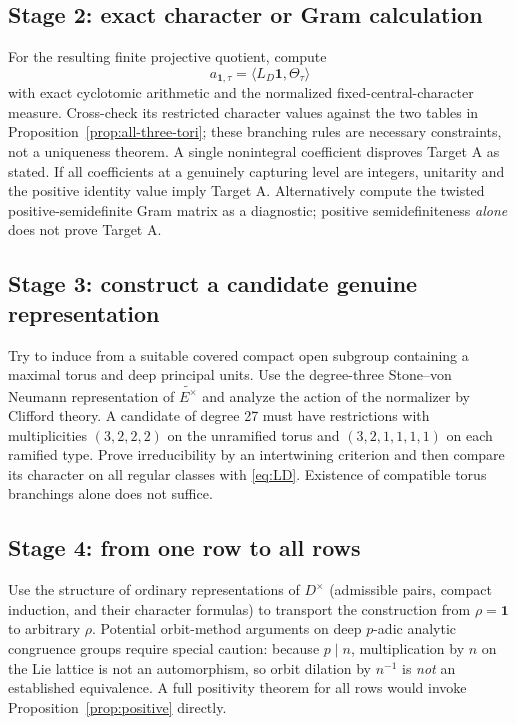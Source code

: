\documentclass[11pt]{article}
\theoremstyle{plain}
\theoremstyle{definition}
\begin{document}
\subsection{Stage 2: exact character or Gram calculation}
For the resulting finite projective quotient, compute
\[
 a_{\mathbf1,\tau}=\langle L_D\mathbf1,\Theta_\tau\rangle
\]
with exact cyclotomic arithmetic and the normalized
fixed-central-character measure.  Cross-check its restricted
character values against the two tables in
Proposition~\ref{prop:all-three-tori}; these branching rules
are necessary constraints, not a uniqueness theorem.
A single nonintegral coefficient disproves Target A as stated.
If all coefficients at a genuinely capturing level are integers,
unitarity and the positive identity value imply Target A.
Alternatively compute the twisted positive-semidefinite Gram
matrix as a diagnostic; positive semidefiniteness \emph{alone}
does not prove Target A.

\subsection{Stage 3: construct a candidate genuine representation}
Try to induce from a suitable covered compact open subgroup
containing a maximal torus and deep principal units.
Use the degree-three Stone--von Neumann representation of
$\widetilde{E^\times}$ and analyze the action of the normalizer
by Clifford theory.  A candidate of degree 27 must have
restrictions with multiplicities $(3,2,2,2)$ on the unramified
torus and $(3,2,1,1,1,1)$ on each ramified type.
Prove irreducibility by an intertwining criterion and then compare
its character on all regular classes with \eqref{eq:LD}.
Existence of compatible torus branchings alone does not suffice.

\subsection{Stage 4: from one row to all rows}
Use the structure of ordinary representations of $D^\times$
(admissible pairs, compact induction, and their character formulas)
to transport the construction from $\rho=\mathbf1$ to arbitrary
$\rho$.  Potential orbit-method arguments on deep $p$-adic
analytic congruence groups require special caution: because
$p\mid n$, multiplication by $n$ on the Lie lattice is not
an automorphism, so orbit dilation by $n^{-1}$ is \emph{not}
an established equivalence.  A full positivity theorem for all
rows would invoke Proposition~\ref{prop:positive} directly.
\end{document}
